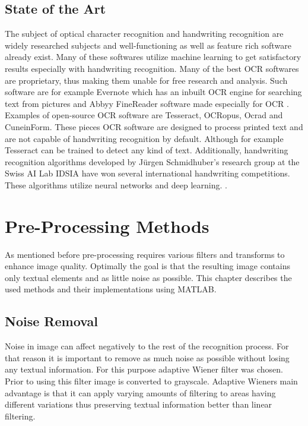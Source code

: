 \documentclass{article}
\begin{document}
    \subsection{State of the Art}
      The subject of optical character recognition and handwriting recognition are widely researched subjects and well-functioning as well as feature rich software already exist. Many of these softwares utilize machine learning to get satisfactory results especially with handwriting recognition. Many of the best OCR softwares are proprietary, thus making them unable for free research and analysis. Such software are for example Evernote which has an inbuilt OCR engine for searching text from pictures \cite{Kelly} and Abbyy FineReader software made especially for OCR \cite{ABBYY}. Examples of open-source OCR software are Tesseract\cite{Smith2007a}, OCRopus\cite{Breuel2007}, Ocrad\cite{FreeSoftwareFoundation2016} and CuneinForm\cite{CognitiveTechnologies2016}. These pieces OCR software are designed to process printed text and are not capable of handwriting recognition by default. Although for example Tesseract can be trained to detect any kind of text.\cite{Smith2007a} Additionally, handwriting recognition algorithms developed by J{\"u}rgen Schmidhuber's research group at the Swiss AI Lab IDSIA have won several international handwriting competitions. These algorithms utilize neural networks and deep learning. \cite{Angelica}.


  \newpage
  \section{Pre-Processing Methods}
  As mentioned before pre-processing requires various filters and transforms to enhance image quality. Optimally the goal is that the resulting image contains only textual elements and as little noise as possible. This chapter describes the used methods and their implementations using MATLAB.


        \subsection{Noise Removal}
          Noise in image can affect negatively to the rest of the recognition process. For that reason it is important to remove as much noise as possible without losing any textual information. For this purpose adaptive Wiener filter was chosen. Prior to using this filter image is converted to grayscale. Adaptive Wieners main advantage is that it can apply varying amounts of filtering to areas having different variations thus preserving textual information better than linear filtering.\cite{TheMathWorksWiener}
\end{document}
